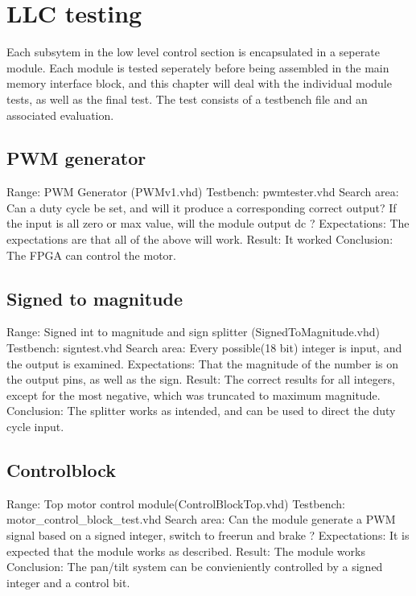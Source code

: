 \chapter{LLC testing}
Each subsytem in the low level control section is encapsulated in a seperate module.
Each module is tested seperately before being assembled in the main memory interface block, and this chapter will deal with the individual module tests, as well as the final test.
The test consists of a testbench file and an associated evaluation.

\section{PWM generator}
Range:                  PWM Generator (PWMv1.vhd)
Testbench: 				pwmtester.vhd
Search area:            Can a duty cycle be set, and will it produce a corresponding correct output?
						If the input is all zero or max value, will the module output dc ?
Expectations:           The expectations are that all of the above will work.
Result:                 It worked
Conclusion:             The FPGA can control the motor. 

\section{Signed to magnitude}
Range:                  Signed int to magnitude and sign splitter (SignedToMagnitude.vhd)
Testbench: 				signtest.vhd
Search area:            Every possible(18 bit) integer is input, and the output is examined.
Expectations:           That the magnitude of the number is on the output pins, as well as the sign.
Result:                 The correct results for all integers, except for the most negative, which was truncated to maximum magnitude.
Conclusion:             The splitter works as intended, and can be used to direct the duty cycle input. 

\section{Controlblock}
Range:                  Top motor control module(ControlBlockTop.vhd)
Testbench: 				motor\_control\_block\_test.vhd
Search area:            Can the module generate a PWM signal based on a signed integer, switch to freerun and brake ?
Expectations:           It is expected that the module works as described.
Result:                 The module works
Conclusion:             The pan/tilt system can be convieniently controlled by a signed integer and a control bit.

